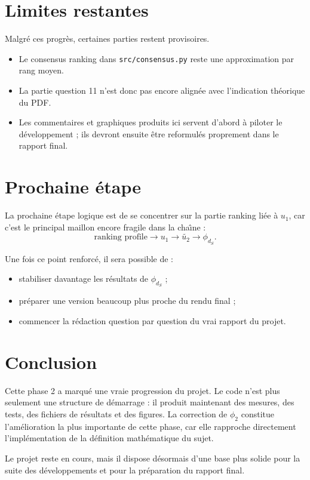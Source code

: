 \documentclass[11pt,a4paper]{article}
\begin{document}
\section{Limites restantes}

Malgr\'e ces progr\`es, certaines parties restent provisoires.

\begin{itemize}[leftmargin=*]
    \item Le consensus ranking dans \texttt{src/consensus.py} reste une approximation par rang moyen.
    \item La partie question 11 n'est donc pas encore align\'ee avec l'indication th\'eorique du PDF.
    \item Les commentaires et graphiques produits ici servent d'abord \`a piloter le d\'eveloppement ; ils devront ensuite \^etre reformul\'es proprement dans le rapport final.
\end{itemize}

\section{Prochaine \'etape}

La prochaine \'etape logique est de se concentrer sur la partie ranking li\'ee \`a \(u_1\), car c'est le principal maillon encore fragile dans la cha\^\i ne :
\[
\text{ranking profile} \rightarrow u_1 \rightarrow \widetilde{u_2} \rightarrow \phi_{d_S}.
\]

Une fois ce point renforc\'e, il sera possible de :
\begin{itemize}[leftmargin=*]
    \item stabiliser davantage les r\'esultats de \(\phi_{d_S}\) ;
    \item pr\'eparer une version beaucoup plus proche du rendu final ;
    \item commencer la r\'edaction question par question du vrai rapport du projet.
\end{itemize}

\section{Conclusion}

Cette phase 2 a marqu\'e une vraie progression du projet. Le code n'est plus seulement une structure de d\'emarrage : il produit maintenant des mesures, des tests, des fichiers de r\'esultats et des figures. La correction de \(\phi_2\) constitue l'am\'elioration la plus importante de cette phase, car elle rapproche directement l'impl\'ementation de la d\'efinition math\'ematique du sujet.

Le projet reste en cours, mais il dispose d\'esormais d'une base plus solide pour la suite des d\'eveloppements et pour la pr\'eparation du rapport final.
\end{document}
